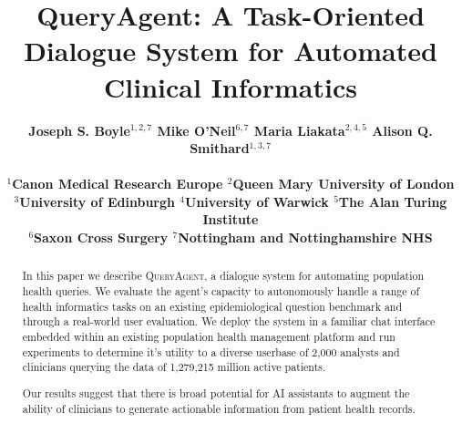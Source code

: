 \documentclass[11pt]{article}
\title{QueryAgent: A Task-Oriented Dialogue System for Automated Clinical Informatics}
\author{ \bf
Joseph S. Boyle$^{1,2,7}$ 
Mike O'Neil$^{6,7}$
Maria Liakata$^{2,4,5}$
Alison Q. Smithard$^{1,3,7}$
\\ \\

$^1$Canon Medical Research Europe $^2$Queen Mary University of London \\ $^3$University of Edinburgh $^4$University of Warwick $^5$The Alan Turing Institute \\ 
$^6$Saxon Cross Surgery $^7$Nottingham and Nottinghamshire NHS
}
\begin{document}



\maketitle
\begin{abstract}
In this paper we describe \textsc{QueryAgent,} a dialogue system for automating population health queries.
We evaluate the agent's capacity to autonomously handle a range of health informatics tasks on an existing epidemiological question benchmark and through a real-world user evaluation.
We deploy the system in a familiar chat interface embedded within an existing population health management platform and run experiments to determine it's utility to a diverse userbase of 2,000 analysts and clinicians querying the data of 1,279,215 million active patients.

Our results suggest that there is broad potential for AI assistants to augment the ability of clinicians to generate actionable information
from patient health records.




\end{abstract}
\end{document}
